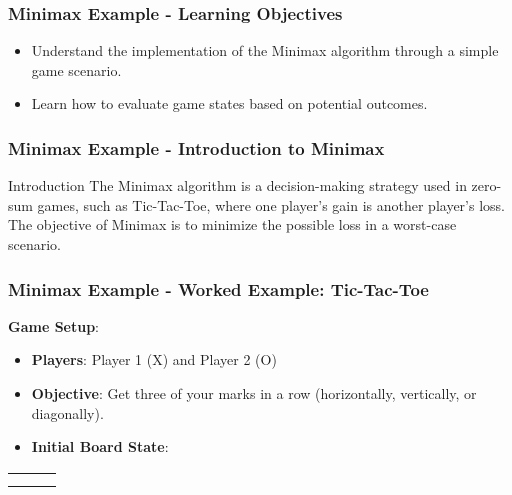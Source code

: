 \documentclass[aspectratio=169]{beamer}
\begin{document}
\begin{frame}[fragile]
    \frametitle{Minimax Example - Learning Objectives}
    \begin{itemize}
        \item Understand the implementation of the Minimax algorithm through a simple game scenario.
        \item Learn how to evaluate game states based on potential outcomes.
    \end{itemize}
\end{frame}

\begin{frame}[fragile]
    \frametitle{Minimax Example - Introduction to Minimax}
    \begin{block}{Introduction}
        The Minimax algorithm is a decision-making strategy used in zero-sum games, such as Tic-Tac-Toe, where one player's gain is another player's loss. The objective of Minimax is to minimize the possible loss in a worst-case scenario.
    \end{block}
\end{frame}

\begin{frame}[fragile]
    \frametitle{Minimax Example - Worked Example: Tic-Tac-Toe}
    \textbf{Game Setup}:
    \begin{itemize}
        \item \textbf{Players}: Player 1 (X) and Player 2 (O)
        \item \textbf{Objective}: Get three of your marks in a row (horizontally, vertically, or diagonally).
        \item \textbf{Initial Board State}:
    \end{itemize}
    \begin{center}
        \begin{tabular}{|c|c|c|}
            \hline
            & & \\ \hline
            & & \\ \hline
            & & \\ \hline
        \end{tabular}
    \end{center}
\end{frame}
\end{document}
